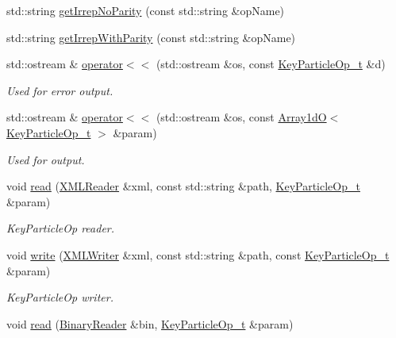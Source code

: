\begin{DoxyCompactItemize}
std\+::string \mbox{\hyperlink{namespaceHadron_ae2543483bce4c1e4b6c9ca56d01fe9ac}{get\+Irrep\+No\+Parity}} (const std\+::string \&op\+Name)
\item 
std\+::string \mbox{\hyperlink{namespaceHadron_a0f40c5d7e590d17294e0a27e231c0a4b}{get\+Irrep\+With\+Parity}} (const std\+::string \&op\+Name)
\item 
std\+::ostream \& \mbox{\hyperlink{namespaceHadron_a1a1ad3c7b1e45f6635516f9f1fcd2684}{operator$<$$<$}} (std\+::ostream \&os, const \mbox{\hyperlink{structHadron_1_1KeyParticleOp__t}{Key\+Particle\+Op\+\_\+t}} \&d)
\begin{DoxyCompactList}\small\item\em Used for error output. \end{DoxyCompactList}\item 
std\+::ostream \& \mbox{\hyperlink{namespaceHadron_a815bc759a8acf71f5194f582a963f3f7}{operator$<$$<$}} (std\+::ostream \&os, const \mbox{\hyperlink{classADAT_1_1Array1dO}{Array1dO}}$<$ \mbox{\hyperlink{structHadron_1_1KeyParticleOp__t}{Key\+Particle\+Op\+\_\+t}} $>$ \&param)
\begin{DoxyCompactList}\small\item\em Used for output. \end{DoxyCompactList}\item 
void \mbox{\hyperlink{namespaceHadron_aa490647cc42691054f51d9885e6ec91c}{read}} (\mbox{\hyperlink{classADATXML_1_1XMLReader}{X\+M\+L\+Reader}} \&xml, const std\+::string \&path, \mbox{\hyperlink{structHadron_1_1KeyParticleOp__t}{Key\+Particle\+Op\+\_\+t}} \&param)
\begin{DoxyCompactList}\small\item\em Key\+Particle\+Op reader. \end{DoxyCompactList}\item 
void \mbox{\hyperlink{namespaceHadron_a1aaa6594011475e4142807cfbf0b78e9}{write}} (\mbox{\hyperlink{classADATXML_1_1XMLWriter}{X\+M\+L\+Writer}} \&xml, const std\+::string \&path, const \mbox{\hyperlink{structHadron_1_1KeyParticleOp__t}{Key\+Particle\+Op\+\_\+t}} \&param)
\begin{DoxyCompactList}\small\item\em Key\+Particle\+Op writer. \end{DoxyCompactList}\item 
void \mbox{\hyperlink{namespaceHadron_a22ce4d5ec6f9bf7a3504cb4b7b176c78}{read}} (\mbox{\hyperlink{classADATIO_1_1BinaryReader}{Binary\+Reader}} \&bin, \mbox{\hyperlink{structHadron_1_1KeyParticleOp__t}{Key\+Particle\+Op\+\_\+t}} \&param)

\end{DoxyCompactItemize}
